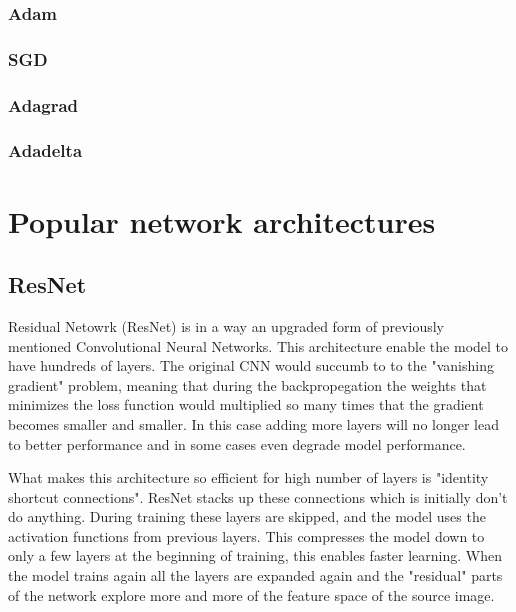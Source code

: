 \documentclass[thesis.tex]{subfiles}
\begin{document}
\subsubsection{Adam}
\subsubsection{SGD}
\subsubsection{Adagrad}
\subsubsection{Adadelta}



\section{Popular network architectures} %


\subsection{ResNet}
Residual Netowrk (ResNet) is in a way an upgraded form of previously mentioned Convolutional Neural Networks. This architecture enable the model to have hundreds of layers. The original CNN would succumb to to the "vanishing gradient" problem, meaning that during the backpropegation the weights that minimizes the loss function would multiplied so many times that the gradient becomes smaller and smaller. In this case adding more layers will no longer lead to better performance and in some cases even degrade model performance. 

What makes this architecture so efficient for high number of layers is "identity shortcut connections". ResNet stacks up these connections which is initially don't do anything. During training these layers are skipped, and the model uses the activation functions from previous layers. This compresses the model down to only a few layers at the beginning of training, this enables faster learning. When the model trains again all the layers are expanded again and the "residual" parts of the network explore more and more of the feature space of the source image.
\end{document}
